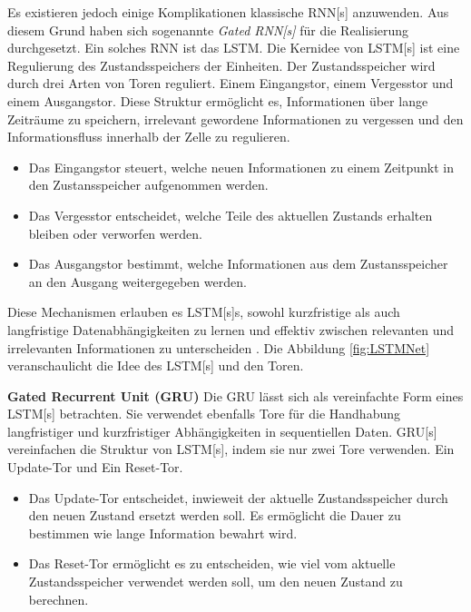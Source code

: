 Es existieren jedoch einige Komplikationen klassische \acrshort{RNN}[s] anzuwenden. Aus diesem Grund haben sich sogenannte \textit{Gated \acrshort{RNN}[s]} für die Realisierung durchgesetzt. Ein solches \acrshort{RNN} ist das \acrshort{LSTM}. Die Kernidee von \acrshort{LSTM}[s] ist eine Regulierung des Zustandsspeichers der Einheiten. Der Zustandsspeicher wird durch drei Arten von Toren reguliert. Einem Eingangstor, einem Vergesstor und einem Ausgangstor. Diese Struktur ermöglicht es, Informationen über lange Zeiträume zu speichern, irrelevant gewordene Informationen zu vergessen und den Informationsfluss innerhalb der Zelle zu regulieren.

\begin{itemize}
    \item Das Eingangstor steuert, welche neuen Informationen zu einem Zeitpunkt in den Zustansspeicher aufgenommen werden.
    \item  Das Vergesstor entscheidet, welche Teile des aktuellen Zustands erhalten bleiben oder verworfen werden.
    \item Das Ausgangstor bestimmt, welche Informationen aus dem Zustansspeicher an den Ausgang weitergegeben werden.
\end{itemize}

Diese Mechanismen erlauben es \acrshort{LSTM}[s]s, sowohl kurzfristige als auch langfristige Datenabhängigkeiten zu lernen und effektiv zwischen relevanten und irrelevanten Informationen zu unterscheiden \cite{Burkov.2019, Goodfellow.2016}. Die Abbildung \ref{fig:LSTMNet} veranschaulicht die Idee des \acrshort{LSTM}[s] und den Toren.


\par
\textbf{Gated Recurrent Unit (\acrshort{GRU})}
Die \acrshort{GRU} lässt sich als vereinfachte Form eines \acrshort{LSTM}[s] betrachten. Sie verwendet ebenfalls Tore für die Handhabung langfristiger und kurzfristiger Abhängigkeiten in sequentiellen Daten. \acrshort{GRU}[s] vereinfachen die Struktur von \acrshort{LSTM}[s], indem sie nur zwei Tore verwenden. Ein Update-Tor und Ein Reset-Tor. \par

\begin{itemize}
    \item Das Update-Tor entscheidet, inwieweit der aktuelle Zustandsspeicher durch den neuen Zustand ersetzt werden soll. Es ermöglicht die Dauer zu bestimmen wie lange Information bewahrt wird.
    \item Das Reset-Tor ermöglicht es zu entscheiden, wie viel vom aktuelle Zustandsspeicher verwendet werden soll, um den neuen Zustand zu berechnen.
\end{itemize}

